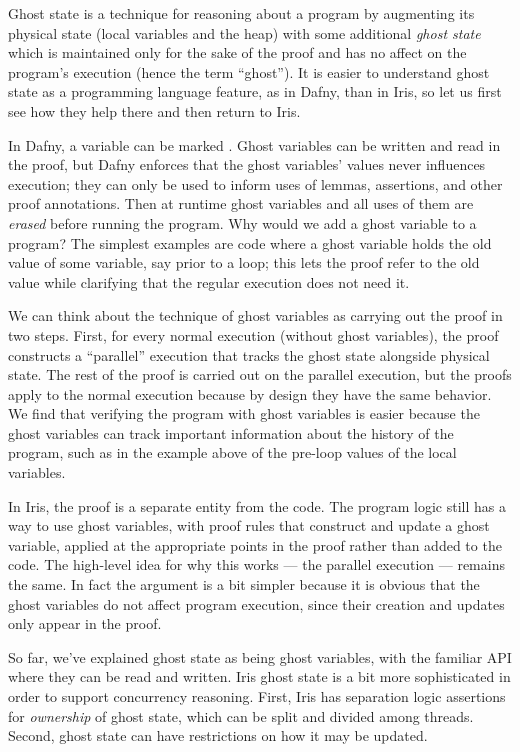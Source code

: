 Ghost state is a technique for reasoning about a program by augmenting its
physical state (local variables and the heap) with some additional \emph{ghost
state} which is maintained only for the sake of the proof and has no affect on
the program's execution (hence the term ``ghost''). It is easier to understand
ghost state as a programming language feature, as in Dafny, than in Iris, so let
us first see how they help there and then return to Iris.

In Dafny, a variable can be marked . Ghost variables can be written
and read in the proof, but Dafny enforces that the ghost variables' values never
influences execution; they can only be used to inform uses of lemmas,
assertions, and other proof annotations. Then at runtime ghost variables and all
uses of them are \emph{erased} before running the program. Why would we add a
ghost variable to a program? The simplest examples are code where a ghost
variable holds the old value of some variable, say prior to a loop; this lets
the proof refer to the old value while clarifying that the regular execution
does not need it.


We can think about the technique of ghost variables as carrying out the proof in
two steps. First, for every normal execution (without ghost variables), the
proof constructs a ``parallel'' execution that tracks the ghost state alongside
physical state. The rest of the proof is carried out on the parallel execution,
but the proofs apply to the normal execution because by design they have the
same behavior. We find that verifying the program with ghost
variables is easier because the ghost variables can track important
information about the history of the program, such as in the example above of
the pre-loop values of the local variables.

In Iris, the proof is a separate entity from the code. The program logic still
has a way to use ghost variables, with proof rules that construct and update a
ghost variable, applied at the appropriate points in the proof rather than added
to the code. The high-level idea for why this works --- the parallel execution ---
remains the same. In fact the argument is a bit simpler because it is obvious
that the ghost variables do not affect program execution, since their creation
and updates only appear in the proof.

So far, we've explained ghost state as being ghost variables, with the familiar
API where they can be read and written. Iris ghost state is a bit more
sophisticated in order to support concurrency reasoning. First, Iris has
separation logic assertions for \emph{ownership} of ghost state, which can be
split and divided among threads. Second, ghost state can have restrictions on
how it may be updated.

